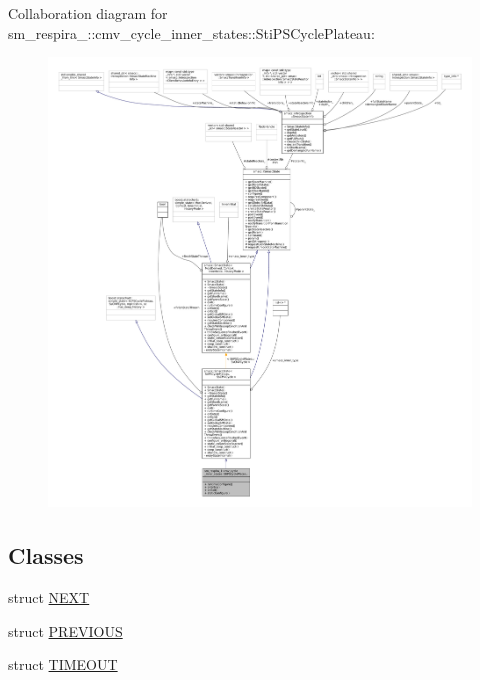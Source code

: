 Collaboration diagram for sm\+\_\+respira\+\_\+:\+:cmv\+\_\+cycle\+\_\+inner\+\_\+states\+:\+:Sti\+P\+S\+Cycle\+Plateau\+:
\nopagebreak
\begin{figure}[H]
\begin{center}
\leavevmode
\includegraphics[width=350pt]{structsm__respira__1_1_1cmv__cycle__inner__states_1_1StiPSCyclePlateau__coll__graph}
\end{center}
\end{figure}
\subsection*{Classes}
\begin{DoxyCompactItemize}
\item 
struct \hyperlink{structsm__respira__1_1_1cmv__cycle__inner__states_1_1StiPSCyclePlateau_1_1NEXT}{N\+E\+XT}
\item 
struct \hyperlink{structsm__respira__1_1_1cmv__cycle__inner__states_1_1StiPSCyclePlateau_1_1PREVIOUS}{P\+R\+E\+V\+I\+O\+US}
\item 
struct \hyperlink{structsm__respira__1_1_1cmv__cycle__inner__states_1_1StiPSCyclePlateau_1_1TIMEOUT}{T\+I\+M\+E\+O\+UT}
\end{DoxyCompactItemize}
